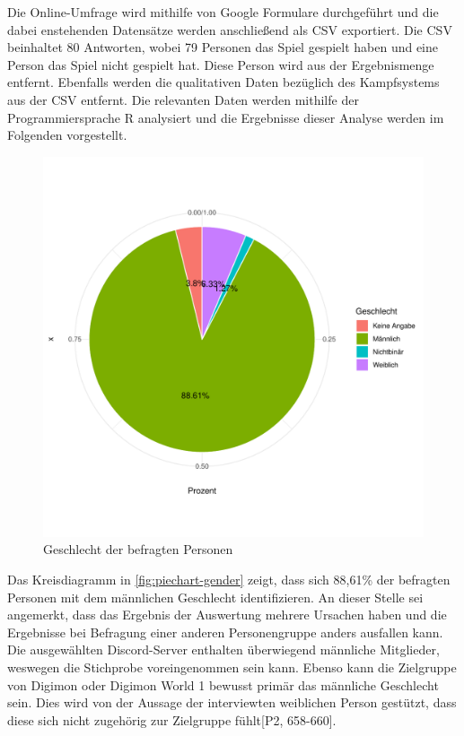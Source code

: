 Die Online-Umfrage wird mithilfe von Google Formulare\cite{google-forms} durchgeführt und die dabei enstehenden Datensätze werden anschließend als \ac{CSV} exportiert. Die \ac{CSV} beinhaltet 80 Antworten, wobei 79 Personen das Spiel gespielt haben und eine Person das Spiel nicht gespielt hat. Diese Person wird aus der Ergebnismenge entfernt. Ebenfalls werden die qualitativen Daten bezüglich des Kampfsystems aus der \ac{CSV} entfernt. Die relevanten Daten werden mithilfe der Programmiersprache R\cite{r-project} analysiert und die Ergebnisse dieser Analyse werden im Folgenden vorgestellt. \\

\begin{figure}[H]
\centering
\includegraphics[width=0.7\columnwidth]{figures/plots/gender.pdf}
\caption{\label{fig:piechart-gender} Geschlecht der befragten Personen}
\end{figure}

Das Kreisdiagramm in \autoref{fig:piechart-gender} zeigt, dass sich 88,61\% der befragten Personen mit dem männlichen Geschlecht identifizieren. An dieser Stelle sei angemerkt, dass das Ergebnis der Auswertung mehrere Ursachen haben und die Ergebnisse bei Befragung einer anderen Personengruppe anders ausfallen kann. Die ausgewählten Discord-Server enthalten überwiegend männliche Mitglieder, weswegen die Stichprobe voreingenommen sein kann. Ebenso kann die Zielgruppe von Digimon oder Digimon World 1 bewusst primär das männliche Geschlecht sein. Dies wird von der Aussage der interviewten weiblichen Person gestützt, dass diese sich nicht zugehörig zur Zielgruppe fühlt[P2, 658-660].\\

